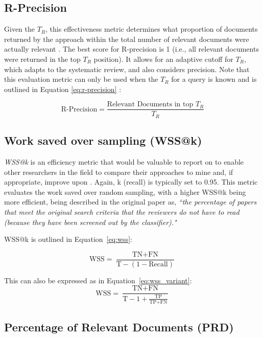 \documentclass[10pt,oneside]{book}
\begin{document}
\subsection{R-Precision}
Given the \textbf{$T_R$}, this effectiveness metric determines what proportion of documents returned by the approach within the total number of relevant documents were actually relevant \cite{manning_introduction_2008}. The best score for R-precision is 1 (i.e., all relevant documents were returned in the top \textbf{$T_R$} position). It allows for an adaptive cutoff for \textbf{$T_R$}, which adapts to the systematic review, and also considers precision. Note that this evaluation metric can only be used when the \textbf{$T_R$} for a query is known and is outlined in Equation \ref{eq:r-precision} :

\begin{equation}
\text{R-Precision} = \frac{\text{Relevant Documents in top } T_R}{T_R}
\label{eq:r-precision}
\end{equation}
\subsection{Work saved over sampling (WSS@k)}

\emph{WSS@k} is an efficiency metric that would be valuable to report on to enable other researchers in the field to compare their approaches to mine and, if appropriate, improve upon \cite{kusa_analysis_2023, cohen_reducing_2006}. Again, k (recall) is typically set to 0.95. This metric evaluates the work saved over random sampling, with a higher WSS@k being more efficient, being described in the original paper as, \emph{``the percentage of papers that meet the original search criteria that the reviewers do not have to read (because they have been screened out by the classifier)."}

WSS@k is outlined in Equation~\ref{eq:wss}:


\begin{equation}
\text{WSS} = \frac{\text{TN} + \text{FN}}{\text{T} - (1 - \text{Recall})}
\label{eq:wss}
\end{equation}

This can also be expressed as in Equation~\ref{eq:wss_variant}:
\begin{equation}
\text{WSS} = \frac{\text{TN} + \text{FN}}{\text{T} - 1 + \frac{\text{TP}}{\text{TP} + \text{FN}}}
\label{eq:wss_variant}
\end{equation}

\subsection{Percentage of Relevant Documents (PRD)}
\end{document}
